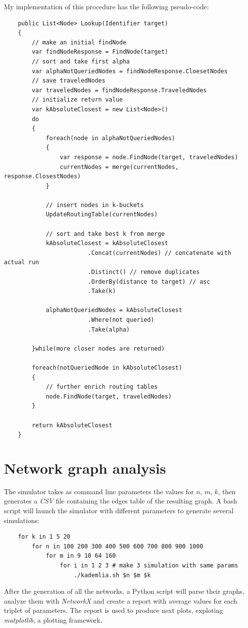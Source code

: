 \documentclass[12pt]{article}
\begin{document}
\noindent
My implementation of this procedure has the following pseudo-code:

\begin{verbatim}
    public List<Node> Lookup(Identifier target)
    {
        // make an initial findNode
        var findNodeResponse = FindNode(target)
        // sort and take first alpha
        var alphaNotQueriedNodes = findNodeResponse.CloesetNodes
        // save traveledNodes
        var traveledNodes = findNodeResponse.TraveledNodes
        // initialize return value
        var kAbsoluteClosest = new List<Node>()
        do
        {
            foreach(node in alphaNotQueriedNodes)
            {
                var response = node.FindNode(target, traveledNodes)
                currentNodes = merge(currentNodes, response.ClosestNodes)
            }
            
            // insert nodes in k-buckets
            UpdateRoutingTable(currentNodes)
            
            // sort and take best k from merge
            kAbsoluteClosest = kAbsoluteClosest
                        .Concat(currentNodes) // concatenate with actual run
                        .Distinct() // remove duplicates
                        .OrderBy(distance to target) // asc
                        .Take(k)
            
            alphaNotQueriedNodes = kAbsoluteClosest
                        .Where(not queried)
                        .Take(alpha)
            
        }while(more closer nodes are returned)
        
        foreach(notQueriedNode in kAbsoluteClosest)
        {
            // further enrich routing tables
            node.FindNode(target, traveledNodes)
        }
        
        return kAbsoluteClosest
    }
\end{verbatim}

\pagebreak

\section{Network graph analysis}

The simulator takes as command line parameters the values for $n$, $m$, $k$, then generates a \textit{CSV} file containing the edges table of the resulting graph. A bash script will launch the simulator with different parameters to generate several simulations:
\begin{verbatim}
    for k in 1 5 20
        for n in 100 200 300 400 500 600 700 800 900 1000
            for m in 9 10 64 160
                for i in 1 2 3 # make 3 simulation with same params
                    ./kademlia.sh $n $m $k
\end{verbatim}
\noindent
After the generation of all the networks, a Python script will parse their graphs, analyze them with \textit{NetworkX} and create a report with average values for each triplet of parameters. The report is used to produce next plots, exploting \textit{matplotlib}, a plotting framework. 
\end{document}
